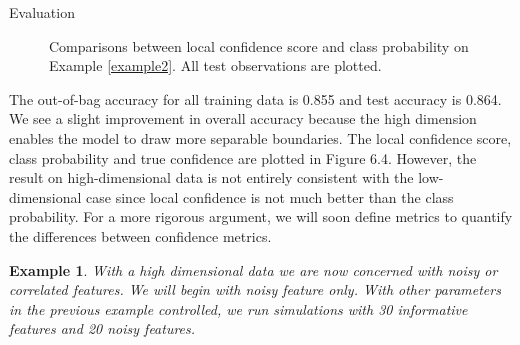 \documentclass[12pt]{pom_thesis}
\newtheorem{example}{Example}[section]
\begin{document}
\begin{chapter}{Evaluation}
\begin{figure}[h]
\label{fig2}
\centering
{}

\caption{Comparisons between local confidence score and class probability on Example \ref{example2}. All test observations are plotted.}
\end{figure}

The out-of-bag accuracy for all training data is 0.855 and test accuracy is 0.864. We see a slight improvement in overall accuracy because the high dimension enables the model to draw more separable boundaries. The local confidence score, class probability and true confidence are plotted in Figure 6.4. However, the result on high-dimensional data is not entirely consistent with the low-dimensional case since local confidence is not much better than the class probability. For a more rigorous argument, we will soon define metrics to quantify the differences between confidence metrics. 



\begin{example}
\label{example3}
With a high dimensional data we are now concerned with noisy or correlated features. We will begin with noisy feature only. With other parameters in the previous example controlled, we run simulations with 30 informative features and 20 noisy features.


\end{example}
\end{chapter}
\end{document}
